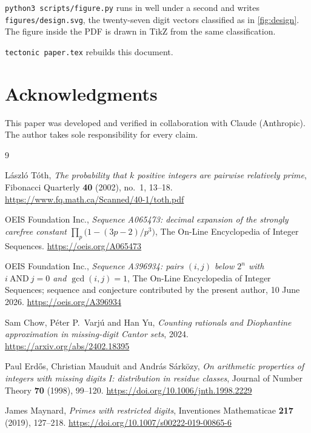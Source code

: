 \documentclass[11pt]{amsart}
\theoremstyle{definition}
\theoremstyle{remark}
\begin{document}
\texttt{python3 scripts/figure.py} runs in well under a second and writes \texttt{figures/design.svg}, the twenty-seven digit vectors classified as in \cref{fig:design}. The figure inside the PDF is drawn in TikZ from the same classification.

\texttt{tectonic paper.tex} rebuilds this document.

\section*{Acknowledgments}

This paper was developed and verified in collaboration with Claude (Anthropic). The author takes sole responsibility for every claim.

\begin{thebibliography}{9}

L\'aszl\'o T\'oth, \emph{The probability that $k$ positive integers are pairwise relatively prime}, Fibonacci Quarterly \textbf{40} (2002), no.~1, 13--18. \url{https://www.fq.math.ca/Scanned/40-1/toth.pdf}

OEIS Foundation Inc., \emph{Sequence A065473: decimal expansion of the strongly carefree constant $\prod_p\bigl(1-(3p-2)/p^3\bigr)$}, The On-Line Encyclopedia of Integer Sequences. \href{https://oeis.org/A065473}{https://oeis.org/A065473}

OEIS Foundation Inc., \emph{Sequence A396934: pairs $(i,j)$ below $2^n$ with $i\ \mathrm{AND}\ j=0$ and $\gcd(i,j)=1$}, The On-Line Encyclopedia of Integer Sequences; sequence and conjecture contributed by the present author, 10 June 2026. \href{https://oeis.org/A396934}{https://oeis.org/A396934}

Sam Chow, P\'eter P.\ Varj\'u and Han Yu, \emph{Counting rationals and Diophantine approximation in missing-digit Cantor sets}, 2024. \url{https://arxiv.org/abs/2402.18395}

Paul Erd\H os, Christian Mauduit and Andr\'as S\'ark\"ozy, \emph{On arithmetic properties of integers with missing digits I: distribution in residue classes}, Journal of Number Theory \textbf{70} (1998), 99--120. \url{https://doi.org/10.1006/jnth.1998.2229}

James Maynard, \emph{Primes with restricted digits}, Inventiones Mathematicae \textbf{217} (2019), 127--218. \url{https://doi.org/10.1007/s00222-019-00865-6}

\end{thebibliography}
\end{document}
